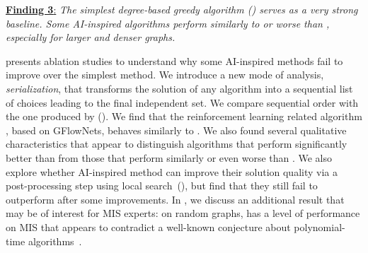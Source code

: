 \underline{\textbf{Finding 3}:} \emph{The simplest degree-based greedy algorithm (\deggreedy) serves as a very strong baseline. Some AI-inspired algorithms perform similarly to or worse than \deggreedy, especially for larger and denser graphs.}

 presents ablation studies to understand why some AI-inspired methods fail to improve over the simplest \deggreedy method. We introduce a new mode of analysis, \emph{serialization}, that transforms the solution of any algorithm into a sequential list of choices leading to the final independent set. We compare sequential order with the one produced by \deggreedy (). We find that the reinforcement learning related algorithm \gflownets, based on GFlowNets, behaves similarly to \deggreedy. We also found several qualitative characteristics that appear to distinguish  algorithms that perform significantly better than \deggreedy from those that perform similarly or even worse than \deggreedy. We also explore whether AI-inspired method can improve their solution quality via a post-processing step using local search~(), but find that they still fail to outperform \kamis after some improvements. In , we discuss an additional result that may be of interest for MIS experts: on random graphs,   \kamis has a level of performance on MIS  that appears to contradict a well-known conjecture about polynomial-time algorithms~\cite{coja2015independent}.